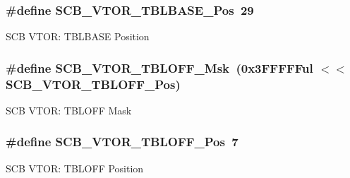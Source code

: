 \subsubsection[{\texorpdfstring{S\+C\+B\+\_\+\+V\+T\+O\+R\+\_\+\+T\+B\+L\+B\+A\+S\+E\+\_\+\+Pos}{SCB_VTOR_TBLBASE_Pos}}]{\setlength{\rightskip}{0pt plus 5cm}\#define S\+C\+B\+\_\+\+V\+T\+O\+R\+\_\+\+T\+B\+L\+B\+A\+S\+E\+\_\+\+Pos~29}\hypertarget{group__CMSIS__CM3__SCB_gad9720a44320c053883d03b883b955751}{}\label{group__CMSIS__CM3__SCB_gad9720a44320c053883d03b883b955751}
S\+CB V\+T\+OR\+: T\+B\+L\+B\+A\+SE Position 
\subsubsection[{\texorpdfstring{S\+C\+B\+\_\+\+V\+T\+O\+R\+\_\+\+T\+B\+L\+O\+F\+F\+\_\+\+Msk}{SCB_VTOR_TBLOFF_Msk}}]{\setlength{\rightskip}{0pt plus 5cm}\#define S\+C\+B\+\_\+\+V\+T\+O\+R\+\_\+\+T\+B\+L\+O\+F\+F\+\_\+\+Msk~(0x3\+F\+F\+F\+F\+Ful $<$$<$ S\+C\+B\+\_\+\+V\+T\+O\+R\+\_\+\+T\+B\+L\+O\+F\+F\+\_\+\+Pos)}\hypertarget{group__CMSIS__CM3__SCB_ga75e395ed74042923e8c93edf50f0996c}{}\label{group__CMSIS__CM3__SCB_ga75e395ed74042923e8c93edf50f0996c}
S\+CB V\+T\+OR\+: T\+B\+L\+O\+FF Mask 
\subsubsection[{\texorpdfstring{S\+C\+B\+\_\+\+V\+T\+O\+R\+\_\+\+T\+B\+L\+O\+F\+F\+\_\+\+Pos}{SCB_VTOR_TBLOFF_Pos}}]{\setlength{\rightskip}{0pt plus 5cm}\#define S\+C\+B\+\_\+\+V\+T\+O\+R\+\_\+\+T\+B\+L\+O\+F\+F\+\_\+\+Pos~7}\hypertarget{group__CMSIS__CM3__SCB_gac6a55451ddd38bffcff5a211d29cea78}{}\label{group__CMSIS__CM3__SCB_gac6a55451ddd38bffcff5a211d29cea78}
S\+CB V\+T\+OR\+: T\+B\+L\+O\+FF Position 